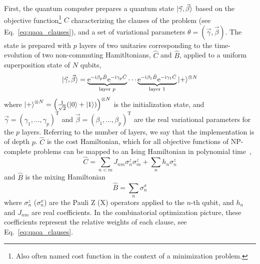 First, the quantum computer prepares a quantum state $\ket{\vec{\gamma}, \vec{\beta}}$ based on the objective function\footnote{Also often named cost function in the context of a minimization problem.} $C$ characterizing the clauses of the problem (see Eq.~\eqref{eq:qaoa_clauses}), and a set of variational parameters $\theta = (\vec \gamma, \vec \beta)$. The state is prepared with $p$ layers of two unitaries corresponding to the time-evolution of two non-commuting Hamitltonians, $\hat C$ and $\hat B$, applied to a uniform superposition state of $N$ qubits,
\begin{equation}
    |\vec{\gamma}, \vec{\beta}\rangle=\underbrace{\mathrm e^{-\mathrm i \beta_{p} \hat B} \mathrm e^{-\mathrm i \gamma_{p} \hat C}}_{\text {layer } p} \cdots \underbrace{\mathrm e^{-\mathrm i \beta_{1} \hat B} \mathrm e^{-\mathrm i \gamma_{1} \hat C}}_{\text {layer } 1}|+\rangle^{\otimes N}
\end{equation}
where  $\ket{+}^{\otimes N} = \left(\frac{1}{\sqrt{2}}(\ket{0}+\ket{1})\right)^{\otimes N}$ is the initialization state, and $\vec\gamma = (\gamma_1, ..., \gamma_p)^\text{T}$ and $\vec\beta = (\beta_1, ... , \beta_p)^\text{T}$ are the real variational parameters for the $p$ layers. Referring to the number of layers, we say that the implementation is of depth $p$. $\hat C$ is the cost Hamiltonian, which for all objective functions of NP-complete problems can be mapped to an Ising Hamiltonian in polynomial time~\cite{Lucas2014IsingProblems},
\begin{equation} \label{eq:ising}
    \hat C =\sum_{n < m} J_{n m} \sigma_{n}^z \sigma_{m}^z + \sum_{n} h_n \sigma_{n}^z
\end{equation}
and $\hat B$ is the mixing Hamiltonian 
\begin{equation}
    \hat B = \sum_{n} \sigma_n^x
\end{equation}
where $\sigma_n^{z}$ ($\sigma_n^{x}$) are the Pauli Z (X) operators applied to the $n$-th qubit, and $h_n$ and $J_{n m}$ are real coefficients. In the combinatorial optimization picture, these coefficients represent the relative weights of each clause, see Eq.~\eqref{eq:qaoa_clauses}.

